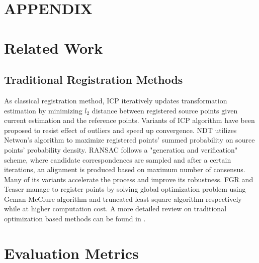 \documentclass[conference,compsoc]{IEEEtran}
\begin{document}
\newpage
\section*{APPENDIX}

\section{Related Work}
\label{Related Work}

\subsection{Traditional Registration Methods}
As classical registration method, ICP \cite{besl1992method} iteratively updates transformation estimation by minimizing ${l_2}$ distance between registered source points given current estimation and the reference points. Variants of ICP algorithm \cite{chen1992object,trucco1999robust,chetverikov2005robust,yang2015go,koide2021voxelized} have been proposed to resist effect of outliers and speed up convergence. NDT \cite{biber2003normal} utilizes Netwon's algorithm to maximize registered points' summed probability on source points' probability density. RANSAC \cite{fischler1981random} follows a "generation and verification" scheme, where candidate correspondences are sampled and after a certain iterations, an alignment is produced based on maximum number of consensus. Many of its variants \cite{2005Matching,5459241,2018Graph} accelerate the process and improve its robustness. FGR \cite{zhou2016fast} and Teaser \cite{yang2020teaser} manage to register points by solving global optimization problem using Geman-McClure algorithm and truncated least square algorithm respectively while at higher computation cost. A more detailed review on traditional optimization based methods can be found in \cite{yang2019performance}.
 
\section{Evaluation Metrics}
\label{Evaluation Metrics}
\end{document}

